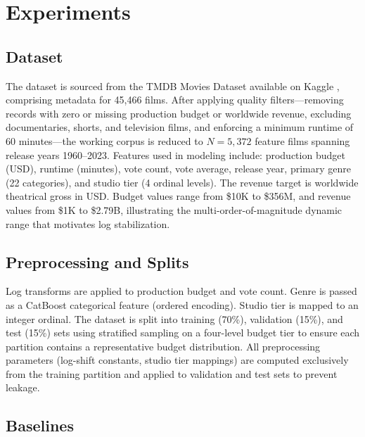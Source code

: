 \documentclass[journal]{IEEEtran}
\begin{document}

\section{Experiments}
\label{sec:experiments}

\subsection{Dataset}

The dataset is sourced from the TMDB Movies Dataset available on Kaggle \cite{tmdb2025kaggle}, comprising metadata for 45,466 films. After applying quality filters—removing records with zero or missing production budget or worldwide revenue, excluding documentaries, shorts, and television films, and enforcing a minimum runtime of 60 minutes—the working corpus is reduced to $N = 5{,}372$ feature films spanning release years 1960–2023. Features used in modeling include: production budget (USD), runtime (minutes), vote count, vote average, release year, primary genre (22 categories), and studio tier (4 ordinal levels). The revenue target is worldwide theatrical gross in USD. Budget values range from \$10K to \$356M, and revenue values from \$1K to \$2.79B, illustrating the multi-order-of-magnitude dynamic range that motivates log stabilization.

\subsection{Preprocessing and Splits}

Log transforms are applied to production budget and vote count. Genre is passed as a CatBoost categorical feature (ordered encoding). Studio tier is mapped to an integer ordinal. The dataset is split into training (70\%), validation (15\%), and test (15\%) sets using stratified sampling on a four-level budget tier to ensure each partition contains a representative budget distribution. All preprocessing parameters (log-shift constants, studio tier mappings) are computed exclusively from the training partition and applied to validation and test sets to prevent leakage.

\subsection{Baselines}
\end{document}
